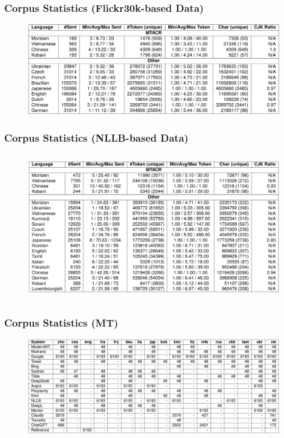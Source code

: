 \documentclass[aspectratio=169]{beamer}
\begin{document}
\begin{frame}[fragile]
	\frametitle{Corpus Statistics (Flickr30k-based Data)}
    \begin{figure}
    \centering
        \includegraphics[width=1.0\textwidth]{images/MTACR-Corpus_statistics_for_Flickr30k_dataset.png} 
    \end{figure}
\end{frame}

\begin{frame}[fragile]
	\frametitle{Corpus Statistics (NLLB-based Data)}
    \begin{figure}
    \centering
        \includegraphics[height=6.5cm]{images/MTACR-Corpus_statistics_for_NLLB_dataset.png} 
    \end{figure}
\end{frame}

\begin{frame}[fragile]
	\frametitle{Corpus Statistics (MT)}
    \begin{figure}
    \centering
        \includegraphics[width=1.0\textwidth]{images/MTACR-Total_sentences_for_each_translation_system_and_language.png} 
    \end{figure}
\end{frame}
\end{document}
